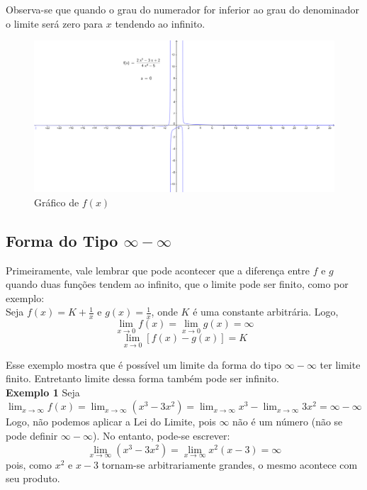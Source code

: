 Observa-se que quando o grau do numerador for inferior ao grau do denominador o limite será zero para $x$ tendendo ao infinito.\\
\begin{figure}[H]
\centering %
\includegraphics[width=15cm]{img/graph12.png} %
\caption{Gráfico de $f(x)$}
\label{fig:graph12}
\end{figure}



\subsection{Forma do Tipo $\infty - \infty$}
\quad Primeiramente, vale lembrar que pode acontecer que a diferença entre $f$ e $g$ quando duas funções tendem ao infinito, que o limite pode ser finito, como por exemplo:\\

Seja $\displaystyle f(x) = K + \frac{1}{x}$ e $\displaystyle g(x) = \frac{1}{x}$, onde $K$ é uma constante arbitrária. Logo,
$$
\lim_{x \to 0} f(x) = \lim_{x \to 0} g(x) = \infty
$$
$$
\lim_{x \to 0} [f(x) - g(x)] = K
$$

Esse exemplo mostra que é possível um limite da forma do tipo $\infty - \infty$ ter limite finito. Entretanto limite dessa forma também pode ser infinito.\\


\textbf{Exemplo 1} Seja $\displaystyle \lim_{x \to \infty}f(x) = \lim_{x \to \infty} (x^3-3x^2) = \lim_{x \to \infty} x^3 - \lim_{x \to \infty} 3x^2 = \infty - \infty$\\
Logo, não podemos aplicar a Lei do Limite, pois $\infty$ não é  um número (não se pode definir $\infty - \infty$). No entanto, pode-se escrever:
$$
\lim_{x \to \infty} (x^3-3x^2) = \lim_{x \to \infty} x^2(x-3) = \infty
$$
pois, como $x^2$ e $x-3$ tornam-se arbitrariamente grandes, o mesmo acontece com seu produto.


